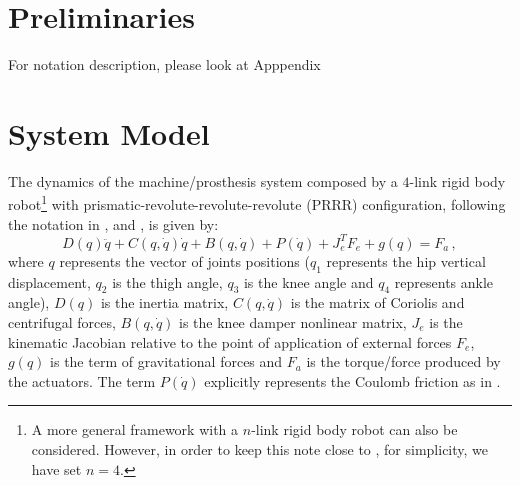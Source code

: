 \documentclass[letterpaper, 10 pt, conference]{ieeeconf}  %
\theoremstyle{plain}
\theoremstyle{definition}
\theoremstyle{remark}
\begin{document}

\section{Preliminaries}

For notation description, please look at Apppendix





\section{System Model}
\label{sec:System_model}

The dynamics of the machine/prosthesis system composed by a $4$-link rigid body robot\footnote{A more general framework with a $n$-link rigid body robot can also be considered. However, in order to keep this note close to \cite{Richter2015}, for simplicity, we have set $n=4$.} with prismatic-revolute-revolute-revolute (PRRR) configuration, following the notation in \cite{Richter2015}, \cite{Warner2015} and \cite{Fakoorian2016}, is given by:
%
\begin{equation}
D(q)\ddot{q} + C(q,\dot{q})\dot{q}+B(q,\dot{q}) + P(\dot{q}) + J_e^T F_e+g(q) = F_a\,,
\label{eq:Dinamica}
\end{equation}
%
where  $q$ represents the vector of joints positions ($q_1$ represents the hip vertical displacement, $q_2$ is the thigh angle, $q_3$ is the knee angle and $q_4$ represents ankle angle), $D(q)$ is the inertia matrix, $C(q,\dot{q})$ is the matrix of Coriolis and centrifugal forces, $B(q,\dot{q})$ is the knee  damper nonlinear matrix, $J_e$ is the kinematic Jacobian relative to the point of application of external forces $F_e$, $g(q)$ is the term of gravitational forces and $F_a$ is the torque/force produced by the actuators. The term  $P(\dot{q})$ explicitly represents the Coulomb friction as in \cite{LeeKhalil2015}. %
\end{document}

